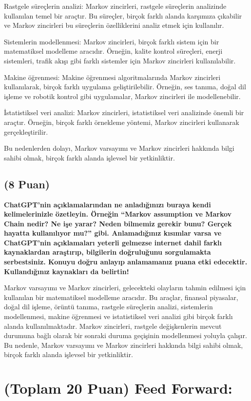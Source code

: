 \documentclass[11pt]{article}
\begin{document}
Rastgele süreçlerin analizi: Markov zincirleri, rastgele süreçlerin analizinde kullanılan temel bir araçtır. Bu süreçler, birçok farklı alanda karşımıza çıkabilir ve Markov zincirleri bu süreçlerin özelliklerini analiz etmek için kullanılır.

Sistemlerin modellenmesi: Markov zincirleri, birçok farklı sistem için bir matematiksel modelleme aracıdır. Örneğin, kalite kontrol süreçleri, enerji sistemleri, trafik akışı gibi farklı sistemler için Markov zincirleri kullanılabilir.

Makine öğrenmesi: Makine öğrenmesi algoritmalarında Markov zincirleri kullanılarak, birçok farklı uygulama geliştirilebilir. Örneğin, ses tanıma, doğal dil işleme ve robotik kontrol gibi uygulamalar, Markov zincirleri ile modellenebilir.

İstatistiksel veri analizi: Markov zincirleri, istatistiksel veri analizinde önemli bir araçtır. Örneğin, birçok farklı örnekleme yöntemi, Markov zincirleri kullanarak gerçekleştirilir.

Bu nedenlerden dolayı, Markov varsayımı ve Markov zincirleri hakkında bilgi sahibi olmak, birçok farklı alanda işlevsel bir yetkinliktir.

\subsection{(8 Puan)} \textbf{ChatGPT’nin açıklamalarından ne anladığınızı buraya kendi kelimelerinizle özetleyin. Örneğin ``Markov assumption ve Markov Chain nedir? Ne işe yarar? Neden bilmemiz gerekir bunu? Gerçek hayatta kullanılıyor mu?'' gibi. Anlamadığınız kısımlar varsa ve ChatGPT’nin açıklamaları yeterli gelmezse internet dahil farklı kaynaklardan araştırıp, bilgilerin doğruluğunu sorgulamakta serbestsiniz. Konuyu doğru anlayıp anlamamanız puana etki edecektir. Kullandığınız kaynakları da belirtin!}

Markov varsayımı ve Markov zincirleri, gelecekteki olayların tahmin edilmesi için kullanılan bir matematiksel modelleme aracıdır. Bu araçlar, finansal piyasalar, doğal dil işleme, örüntü tanıma, rastgele süreçlerin analizi, sistemlerin modellenmesi, makine öğrenmesi ve istatistiksel veri analizi gibi birçok farklı alanda kullanılmaktadır. Markov zincirleri, rastgele değişkenlerin mevcut durumuna bağlı olarak bir sonraki duruma geçişinin modellenmesi yoluyla çalışır. Bu nedenle, Markov varsayımı ve Markov zincirleri hakkında bilgi sahibi olmak, birçok farklı alanda işlevsel bir yetkinliktir. 

\section{(Toplam 20 Puan) Feed Forward:}
 
\end{document}
